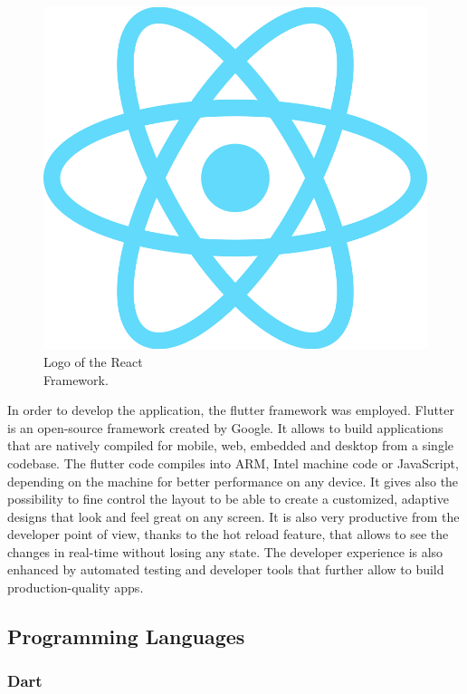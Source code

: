 \begin{figure} %
    \captionsetup{font=footnotesize}
    \centering
    \includegraphics[width=\linewidth]{images/react.png}
    \caption{Logo of the React\\Framework.}
\end{figure}

In order to develop the application, the flutter framework was employed. Flutter is an open-source framework created by Google. It allows to build applications that are natively compiled for mobile, web, embedded and desktop from a single codebase. The flutter code compiles into ARM, Intel machine code or JavaScript, depending on the machine for better performance on any device. It gives also the possibility to fine control the layout to be able to create a customized, adaptive designs that look and feel great on any screen. It is also very productive from the developer point of view, thanks to the hot reload feature, that allows to see the changes in real-time without losing any state. The developer experience is also enhanced by automated testing and developer tools that further allow to build production-quality apps.

\subsection{Programming Languages}
\subsubsection{Dart}
\label{subsubsec:dart}

